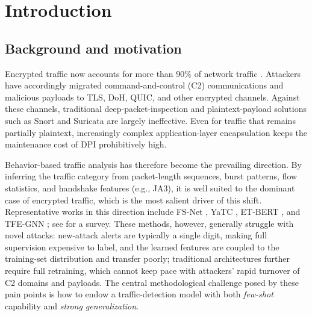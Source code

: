 \documentclass[sensors,article,submit,moreauthors]{Definitions/mdpi}
\begin{document}

\section{Introduction}

\subsection{Background and motivation}

Encrypted traffic now accounts for more than 90\% of network traffic \cite{cisco2024threat}. Attackers have accordingly migrated command-and-control (C2) communications and malicious payloads to TLS, DoH, QUIC, and other encrypted channels. Against these channels, traditional deep-packet-inspection and plaintext-payload solutions such as Snort and Suricata are largely ineffective. Even for traffic that remains partially plaintext, increasingly complex application-layer encapsulation keeps the maintenance cost of DPI prohibitively high.

Behavior-based traffic analysis has therefore become the prevailing direction. By inferring the traffic category from packet-length sequences, burst patterns, flow statistics, and handshake features (e.g., JA3), it is well suited to the dominant case of encrypted traffic, which is the most salient driver of this shift. Representative works in this direction include FS-Net \cite{liu2019fsnet}, YaTC \cite{zhao2023yatc}, ET-BERT \cite{lin2022etbert}, and TFE-GNN \cite{zhang2023tfegnn}; see \cite{dhinakar2026survey} for a survey. These methods, however, generally struggle with novel attacks: new-attack alerts are typically a single digit, making full supervision expensive to label, and the learned features are coupled to the training-set distribution and transfer poorly; traditional architectures further require full retraining, which cannot keep pace with attackers' rapid turnover of C2 domains and payloads. The central methodological challenge posed by these pain points is how to endow a traffic-detection model with both \emph{few-shot} capability and \emph{strong generalization}.
\end{document}
